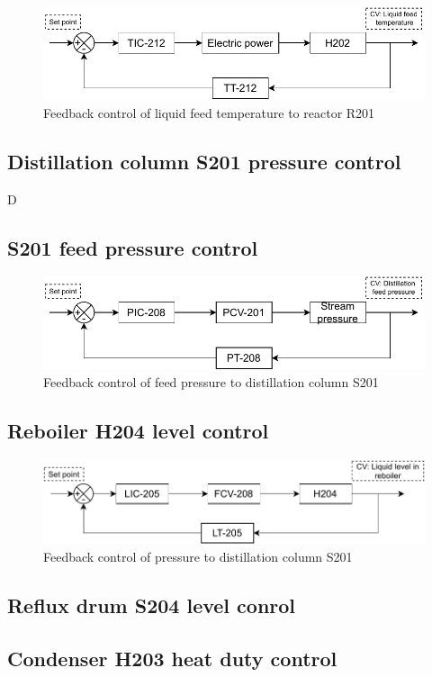     \begin{figure}[H]
        \centering
        \includegraphics[width=0.9\linewidth]{chapters/4-operation-control/4-Figures/H202-TC.pdf}
        \caption{Feedback control of liquid feed temperature to reactor R201}
        \label{fig:H202-TC}
    \end{figure} 

\subsection{Distillation column S201 pressure control}

D

\subsection{S201 feed pressure control}

    \begin{figure}[H]
        \centering
        \includegraphics[width=0.9\linewidth]{chapters/4-operation-control/4-Figures/PCV201-PC.pdf}
        \caption{Feedback control of feed pressure to distillation column S201}
        \label{fig:PCV201-PC}
    \end{figure}     

\subsection{Reboiler H204 level control}

    \begin{figure}[H]
        \centering
        \includegraphics[width=0.9\linewidth]{chapters/4-operation-control/4-Figures/H204-LC.pdf}
        \caption{Feedback control of  pressure to distillation column S201}
        \label{fig:PCV201-PC}
    \end{figure}  

\subsection{Reflux drum S204 level conrol}

\subsection{Condenser H203 heat duty control}

